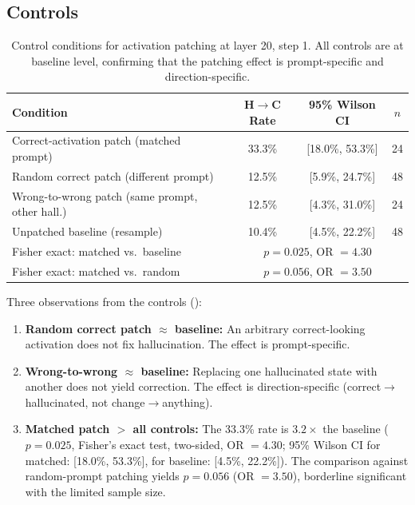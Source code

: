\documentclass[11pt,a4paper]{article}
\begin{document}
\subsection{Controls}

\begin{table}[h]
\centering
\caption{Control conditions for activation patching at layer 20, step 1. All controls are at baseline level, confirming that the patching effect is prompt-specific and direction-specific.}
\label{tab:controls}
\begin{tabular}{lccc}
\toprule
\textbf{Condition} & \textbf{H$\to$C Rate} & \textbf{95\% Wilson CI} & \textbf{$n$} \\
\midrule
Correct-activation patch (matched prompt) & 33.3\% & [18.0\%, 53.3\%] & 24 \\
Random correct patch (different prompt) & 12.5\% & [5.9\%, 24.7\%] & 48 \\
Wrong-to-wrong patch (same prompt, other hall.) & 12.5\% & [4.3\%, 31.0\%] & 24 \\
Unpatched baseline (resample) & 10.4\% & [4.5\%, 22.2\%] & 48 \\
\midrule
Fisher exact: matched vs.\ baseline & \multicolumn{3}{c}{$p = 0.025$, OR $= 4.30$} \\
Fisher exact: matched vs.\ random & \multicolumn{3}{c}{$p = 0.056$, OR $= 3.50$} \\
\bottomrule
\end{tabular}
\end{table}

Three observations from the controls ():

\begin{enumerate}
    \item \textbf{Random correct patch $\approx$ baseline:} An arbitrary correct-looking activation does not fix hallucination. The effect is prompt-specific.
    \item \textbf{Wrong-to-wrong $\approx$ baseline:} Replacing one hallucinated state with another does not yield correction. The effect is direction-specific (correct$\to$hallucinated, not change$\to$anything).
    \item \textbf{Matched patch $>$ all controls:} The 33.3\% rate is $3.2\times$ the baseline ($p = 0.025$, Fisher's exact test, two-sided, OR $= 4.30$; 95\% Wilson CI for matched: [18.0\%, 53.3\%], for baseline: [4.5\%, 22.2\%]). The comparison against random-prompt patching yields $p = 0.056$ (OR $= 3.50$), borderline significant with the limited sample size.
\end{enumerate}
\end{document}
